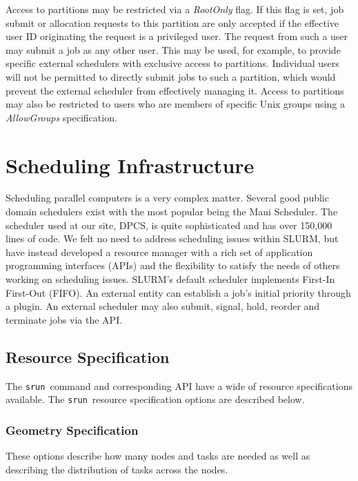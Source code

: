 \documentclass{article}
\newcommand{\srun}{{\tt srun}}
\begin{document}
Access to partitions may be restricted via a {\em RootOnly} flag.  
If this flag is set, job submit or allocation requests to this 
partition are only accepted if the effective user ID originating 
the request is a privileged user. 
The request from such a user may submit a job as any other user. 
This may be used, for example, to provide specific external schedulers
with exclusive access to partitions.  Individual users will not be 
permitted to directly submit jobs to such a partition, which would 
prevent the external scheduler from effectively managing it.  
Access to partitions may also be restricted to users who are 
members of specific Unix groups using a {\em AllowGroups} specification.

\section{Scheduling Infrastructure}

Scheduling parallel computers is a very complex matter.  
Several good public domain schedulers exist with the most 
popular being the Maui Scheduler\cite{Jackson2001,Maui2002}. 
The scheduler used at our site, DPCS\cite{DPCS2002}, is quite 
sophisticated and has over 150,000 lines of code. 
We felt no need to address scheduling issues within SLURM, but 
have instead developed a resource manager with a rich set of 
application programming interfaces (APIs) and the flexibility 
to satisfy the needs of others working on scheduling issues.  
SLURM's default scheduler implements First-In First-Out (FIFO). 
An external entity can establish a job's initial priority 
through a plugin.
An external scheduler may also submit, signal, hold, reorder and 
terminate jobs via the API.

\subsection{Resource Specification}

The \srun\ command and corresponding API have a wide of resource 
specifications available. The \srun\ resource specification options 
are described below.

\subsubsection{Geometry Specification}

These options describe how many nodes and tasks are needed as
well as describing the distribution of tasks across the nodes.
\end{document}
